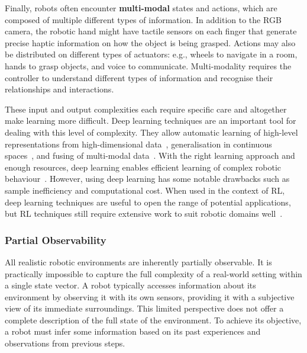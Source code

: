 Finally, robots often encounter \textbf{multi-modal} states and actions, which are composed of multiple different types of information. In addition to the RGB camera, the robotic hand might have tactile sensors on each finger that generate precise haptic information on how the object is being grasped. Actions may also be distributed on different types of actuators: e.g., wheels to navigate in a room, hands to grasp objects, and voice to communicate. Multi-modality requires the controller to understand different types of information and recognise their relationships and interactions. 

These input and output complexities each require specific care and altogether make learning more difficult. Deep learning techniques are an important tool for dealing with this level of complexity. They allow automatic learning of high-level representations from high-dimensional data~\citep{Simonyan2015_VGG}, generalisation in continuous spaces~\citep{Schulman2016_GAE}, and fusing of multi-modal data~\citep{Radford2021_CLIP, Driess2023_PaLME}. With the right learning approach and enough resources, deep learning enables efficient learning of complex robotic behaviour~\citep{Pinto2016_SelfSupervisedGrasp, OpenAI2020_DextHandManip}. However, using deep learning has some notable drawbacks such as sample inefficiency and computational cost. When used in the context of RL, deep learning techniques are useful to open the range of potential applications, but RL techniques still require extensive work to suit robotic domains well~\citep{Sunderhauf2018_Limits, Ibarz2021_Howto}. 


\subsubsection{Partial Observability}\label{sec:MAL:PartialObs}

All realistic robotic environments are inherently partially observable. It is practically impossible to capture the full complexity of a real-world setting within a single state vector. A robot typically accesses information about its environment by observing it with its own sensors, providing it with a subjective view of its immediate surroundings. This limited perspective does not offer a complete description of the full state of the environment. To achieve its objective, a robot must infer some information based on its past experiences and observations from previous steps. 

